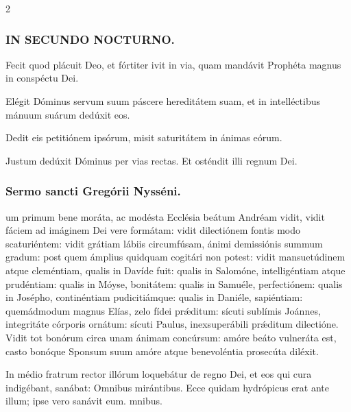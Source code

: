 \documentclass[9pt,twoside]{extarticle}
\begin{document}
\begin{multicols}{2}
\subsubsection*{\center \textsc{IN SECUNDO NOCTURNO.}}
\begin{tightlist}{}
\item {} Fecit quod plácuit Deo, et fórtiter ivit in via, quam mandávit Prophéta magnus in conspéctu Dei.
\item {} Elégit Dóminus servum suum páscere hereditátem suam, et in intelléctibus mánuum suárum dedúxit eos.
\item {} Dedit eis petitiónem ipsórum, misit saturitátem in ánimas eórum.
\item {} Justum dedúxit Dóminus per vias rectas.  Et osténdit illi regnum Dei.
\end{tightlist}

\subsubsection*{\center Sermo sancti Gregórii Nysséni.}
\begin{center}\end{center}
um primum bene moráta, ac modésta Ecclésia beátum Andréam vidit, vidit fáciem ad imáginem Dei vere formátam: vidit dilectiónem fontis modo scaturiéntem: vidit grátiam lábiis circumfúsam, ánimi demissiónis summum gradum: post quem ámplius quidquam cogitári non potest: vidit mansuetúdinem atque cleméntiam, qualis in Davíde fuit: qualis in Salomóne, intelligéntiam atque prudéntiam: qualis in Móyse, bonitátem: qualis in Samuéle, perfectiónem: qualis in Josépho, continéntiam pudicitiámque: qualis in Daniéle, sapiéntiam: quemádmodum magnus Elías, zelo fídei prǽditum: sícuti sublímis Joánnes, integritáte córporis ornátum: sícuti Paulus, inexsuperábili prǽditum dilectióne. Vidit tot bonórum circa unam ánimam concúrsum: amóre beáto vulneráta est, casto bonóque Sponsum suum amóre atque benevoléntia prosecúta diléxit.

\begin{tightlist}{}
\item {} In médio fratrum rector illórum loquebátur de regno Dei, et eos qui cura indigébant, sanábat: \textred{*} Omnibus mirántibus.  Ecce quidam hydrópicus erat ante illum; ipse vero sanávit eum. mnibus.
\end{tightlist}


\end{multicols}
\end{document}
